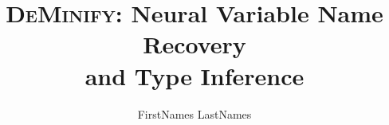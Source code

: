 \documentclass[sigconf,review]{acmart}
\newcommand{\tool}{\textsc{DeMinify}\xspace}
\begin{document}


\title[{\tool}: Neural Variable Name Recovery and Type Inference]
{{\tool}: Neural Variable Name Recovery\\ and Type Inference}




\author{FirstNames LastNames}








\end{document}
